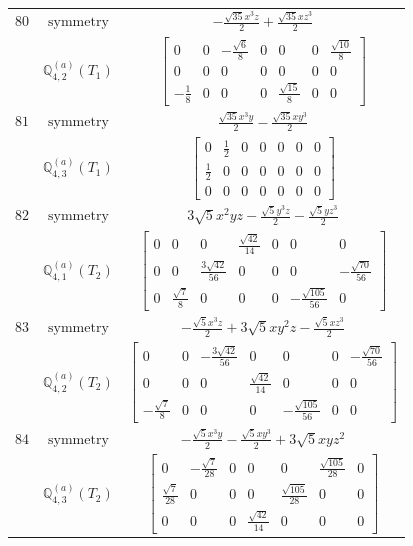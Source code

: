 \documentclass[fleqn,8pt,landscape]{jsarticle}
\begin{document}
\begin{longtable}{ccc}
$ 80 $ & $ \text{symmetry} $ & $ - \frac{\sqrt{35} x^{3} z}{2} + \frac{\sqrt{35} x z^{3}}{2} $ \\
$  $ & $ \mathbb{Q}_{4,2}^{(a)}(T_{1}) $ & $ \begin{bmatrix} 0 & 0 & - \frac{\sqrt{6}}{8} & 0 & 0 & 0 & \frac{\sqrt{10}}{8} \\ 0 & 0 & 0 & 0 & 0 & 0 & 0 \\ - \frac{1}{8} & 0 & 0 & 0 & \frac{\sqrt{15}}{8} & 0 & 0 \end{bmatrix} $ \\ \hline
$ 81 $ & $ \text{symmetry} $ & $ \frac{\sqrt{35} x^{3} y}{2} - \frac{\sqrt{35} x y^{3}}{2} $ \\
$  $ & $ \mathbb{Q}_{4,3}^{(a)}(T_{1}) $ & $ \begin{bmatrix} 0 & \frac{1}{2} & 0 & 0 & 0 & 0 & 0 \\ \frac{1}{2} & 0 & 0 & 0 & 0 & 0 & 0 \\ 0 & 0 & 0 & 0 & 0 & 0 & 0 \end{bmatrix} $ \\ \hline
$ 82 $ & $ \text{symmetry} $ & $ 3 \sqrt{5} x^{2} y z - \frac{\sqrt{5} y^{3} z}{2} - \frac{\sqrt{5} y z^{3}}{2} $ \\
$  $ & $ \mathbb{Q}_{4,1}^{(a)}(T_{2}) $ & $ \begin{bmatrix} 0 & 0 & 0 & \frac{\sqrt{42}}{14} & 0 & 0 & 0 \\ 0 & 0 & \frac{3 \sqrt{42}}{56} & 0 & 0 & 0 & - \frac{\sqrt{70}}{56} \\ 0 & \frac{\sqrt{7}}{8} & 0 & 0 & 0 & - \frac{\sqrt{105}}{56} & 0 \end{bmatrix} $ \\ \hline
$ 83 $ & $ \text{symmetry} $ & $ - \frac{\sqrt{5} x^{3} z}{2} + 3 \sqrt{5} x y^{2} z - \frac{\sqrt{5} x z^{3}}{2} $ \\
$  $ & $ \mathbb{Q}_{4,2}^{(a)}(T_{2}) $ & $ \begin{bmatrix} 0 & 0 & - \frac{3 \sqrt{42}}{56} & 0 & 0 & 0 & - \frac{\sqrt{70}}{56} \\ 0 & 0 & 0 & \frac{\sqrt{42}}{14} & 0 & 0 & 0 \\ - \frac{\sqrt{7}}{8} & 0 & 0 & 0 & - \frac{\sqrt{105}}{56} & 0 & 0 \end{bmatrix} $ \\ \hline
$ 84 $ & $ \text{symmetry} $ & $ - \frac{\sqrt{5} x^{3} y}{2} - \frac{\sqrt{5} x y^{3}}{2} + 3 \sqrt{5} x y z^{2} $ \\
$  $ & $ \mathbb{Q}_{4,3}^{(a)}(T_{2}) $ & $ \begin{bmatrix} 0 & - \frac{\sqrt{7}}{28} & 0 & 0 & 0 & \frac{\sqrt{105}}{28} & 0 \\ \frac{\sqrt{7}}{28} & 0 & 0 & 0 & \frac{\sqrt{105}}{28} & 0 & 0 \\ 0 & 0 & 0 & \frac{\sqrt{42}}{14} & 0 & 0 & 0 \end{bmatrix} $ \\ \hline

\end{longtable}
\end{document}
